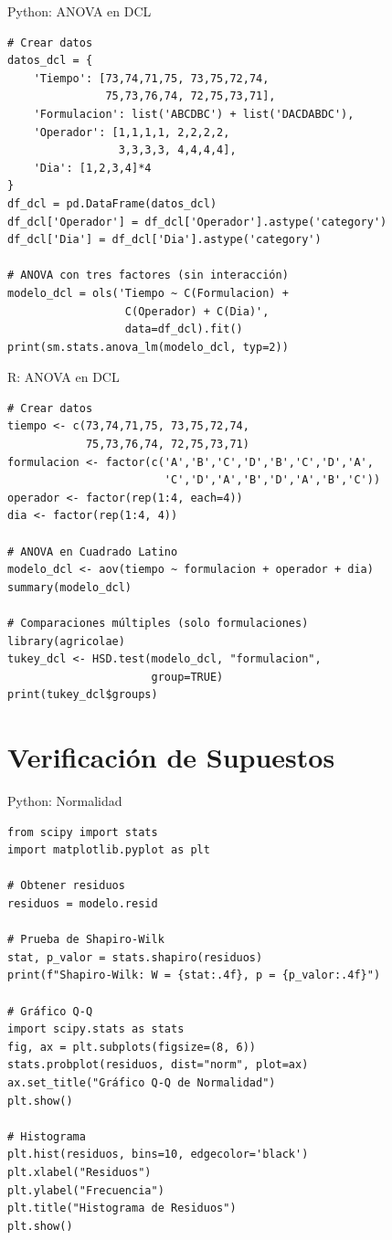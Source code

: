 \documentclass[aspectratio=169]{beamer}
\begin{document}
\begin{frame}[fragile]{Python: ANOVA en DCL}
\small
\begin{verbatim}
# Crear datos
datos_dcl = {
    'Tiempo': [73,74,71,75, 73,75,72,74,
               75,73,76,74, 72,75,73,71],
    'Formulacion': list('ABCDBC') + list('DACDABDC'),
    'Operador': [1,1,1,1, 2,2,2,2,
                 3,3,3,3, 4,4,4,4],
    'Dia': [1,2,3,4]*4
}
df_dcl = pd.DataFrame(datos_dcl)
df_dcl['Operador'] = df_dcl['Operador'].astype('category')
df_dcl['Dia'] = df_dcl['Dia'].astype('category')

# ANOVA con tres factores (sin interacción)
modelo_dcl = ols('Tiempo ~ C(Formulacion) + 
                  C(Operador) + C(Dia)',
                  data=df_dcl).fit()
print(sm.stats.anova_lm(modelo_dcl, typ=2))
\end{verbatim}
\end{frame}

\begin{frame}[fragile]{R: ANOVA en DCL}
\small
\begin{verbatim}
# Crear datos
tiempo <- c(73,74,71,75, 73,75,72,74,
            75,73,76,74, 72,75,73,71)
formulacion <- factor(c('A','B','C','D','B','C','D','A',
                        'C','D','A','B','D','A','B','C'))
operador <- factor(rep(1:4, each=4))
dia <- factor(rep(1:4, 4))

# ANOVA en Cuadrado Latino
modelo_dcl <- aov(tiempo ~ formulacion + operador + dia)
summary(modelo_dcl)

# Comparaciones múltiples (solo formulaciones)
library(agricolae)
tukey_dcl <- HSD.test(modelo_dcl, "formulacion",
                      group=TRUE)
print(tukey_dcl$groups)
\end{verbatim}
\end{frame}

\section{Verificación de Supuestos}

\begin{frame}[fragile]{Python: Normalidad}
\small
\begin{verbatim}
from scipy import stats
import matplotlib.pyplot as plt

# Obtener residuos
residuos = modelo.resid

# Prueba de Shapiro-Wilk
stat, p_valor = stats.shapiro(residuos)
print(f"Shapiro-Wilk: W = {stat:.4f}, p = {p_valor:.4f}")

# Gráfico Q-Q
import scipy.stats as stats
fig, ax = plt.subplots(figsize=(8, 6))
stats.probplot(residuos, dist="norm", plot=ax)
ax.set_title("Gráfico Q-Q de Normalidad")
plt.show()

# Histograma
plt.hist(residuos, bins=10, edgecolor='black')
plt.xlabel("Residuos")
plt.ylabel("Frecuencia")
plt.title("Histograma de Residuos")
plt.show()
\end{verbatim}
\end{frame}
\end{document}
